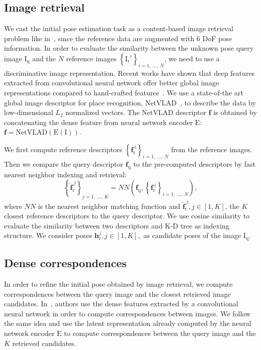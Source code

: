 \subsection{Image retrieval}
\label{subsec:image_indexing}

We cast the initial pose estimation task as a content-based image retrieval problem like in~\cite{Balntas2018}, since the reference data are augmented with 6 DoF pose information. In order to evaluate the similarity between the unknown pose query image $\mathrm{I_{q}}$ and the $N$ reference images $\left\{\mathrm{I_{r}}^{i} \right\}_{i=1,\ \ldots ,\ N}$, we need to use a discriminative image representation. Recent works have shown that deep features extracted from convolutional neural network offer better global image representations compared to hand-crafted features~\cite{Razavian2014a, Arandjelovic2017, Gordo2017, Radenovic2017}. We use a state-of-the art global image descriptor for place recognition, NetVLAD~\cite{Arandjelovic2017}, to describe the data by low-dimensional $L_2$ normalized vectors. The NetVLAD descriptor $\mathbf{f}$ is obtained by concatenating the dense feature from neural network encoder $\mathrm{E}$: $\mathbf{f} = \mathrm{NetVLAD}(\mathrm{E}(\mathrm{I}))$.

We first compute reference descriptors $\left\{ \mathbf{f}_{\mathrm{r}}^{\ i} \right\}_{i=1,\ \ldots ,\ N}$ from the reference images. Then we compare the query descriptor $\mathbf{f}_{\mathrm{q}}$ to the pre-computed descriptors by fast nearest neighbor indexing and retrieval:
\begin{equation}
	\left\{ \mathbf{\hat{f}}_{\mathrm{r}}^{\ j} \right\}_{j=1,\ \ldots ,\ K} = NN \left( \mathbf{f}_{\mathrm{q}}, \left\{ \mathbf{f}_{\mathrm{r}}^{\ i} \right\}_{i=1,\ \ldots ,\ N} \right),
\end{equation}
where $NN$ is the nearest neighbor matching function and $\mathbf{\hat{f}}_{\mathrm{r}}^{\ j}, j \in [1, K]$, the $K$ closest reference descriptors to the query descriptor. We use cosine similarity to evaluate the similarity between two descriptors and K-D tree as indexing structure. We consider poses $\mathbf{h}_\mathrm{r}^j, j \in [1, K],$ as candidate poses of the image $\mathrm{I_q}$.

\subsection{Dense correspondences}
\label{subsec:matching}

In order to refine the initial pose obtained by image retrieval, we compute correspondences between the query image and the closest retrieved image candidates. In~\citep{Taira2018}, authors use the dense features extracted by a convolutional neural network in order to compute correspondences between images. We follow the same idea and use the latent representation already computed by the neural network encoder $\mathrm{E}$ to compute correspondences between the query image and the $K$ retrieved candidates.

